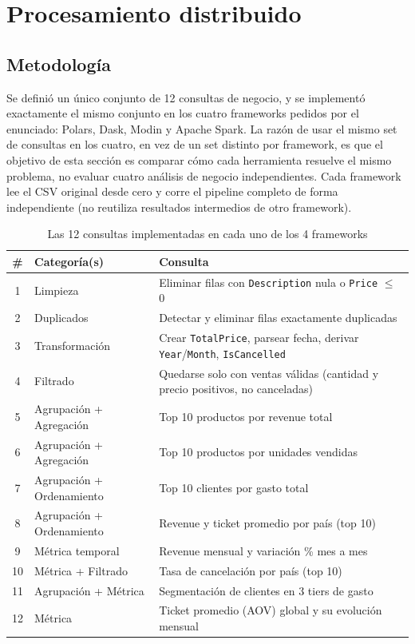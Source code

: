 \section{Procesamiento distribuido}
\label{sec:procesamiento}

\subsection{Metodología}

Se definió un único conjunto de 12 consultas de negocio, y se implementó exactamente el mismo conjunto en los cuatro frameworks pedidos por el enunciado: Polars, Dask, Modin y Apache Spark. La razón de usar el mismo set de consultas en los cuatro, en vez de un set distinto por framework, es que el objetivo de esta sección es comparar cómo cada herramienta resuelve el mismo problema, no evaluar cuatro análisis de negocio independientes. Cada framework lee el CSV original desde cero y corre el pipeline completo de forma independiente (no reutiliza resultados intermedios de otro framework).

\begin{table}[H]
\centering
\small
\begin{tabular}{clp{7.5cm}}
\toprule
\textbf{\#} & \textbf{Categoría(s)} & \textbf{Consulta} \\
\midrule
1 & Limpieza & Eliminar filas con \texttt{Description} nula o \texttt{Price} $\leq$ 0 \\
2 & Duplicados & Detectar y eliminar filas exactamente duplicadas \\
3 & Transformación & Crear \texttt{TotalPrice}, parsear fecha, derivar \texttt{Year}/\texttt{Month}, \texttt{IsCancelled} \\
4 & Filtrado & Quedarse solo con ventas válidas (cantidad y precio positivos, no canceladas) \\
5 & Agrupación + Agregación & Top 10 productos por revenue total \\
6 & Agrupación + Agregación & Top 10 productos por unidades vendidas \\
7 & Agrupación + Ordenamiento & Top 10 clientes por gasto total \\
8 & Agrupación + Ordenamiento & Revenue y ticket promedio por país (top 10) \\
9 & Métrica temporal & Revenue mensual y variación \% mes a mes \\
10 & Métrica + Filtrado & Tasa de cancelación por país (top 10) \\
11 & Agrupación + Métrica & Segmentación de clientes en 3 tiers de gasto \\
12 & Métrica & Ticket promedio (AOV) global y su evolución mensual \\
\bottomrule
\end{tabular}
\caption{Las 12 consultas implementadas en cada uno de los 4 frameworks}
\label{tab:consultas}
\end{table}

